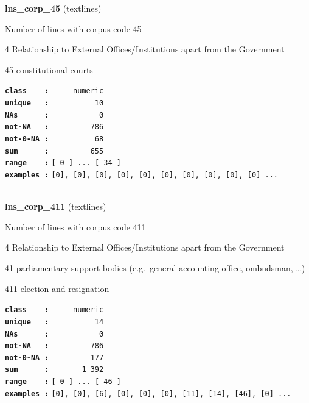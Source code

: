 \documentclass[]{article}
\begin{document}
\textbf{lns\_corp\_45} (textlines)

Number of lines with corpus code 45

4 Relationship to External Offices/Institutions apart from the
Government

45 constitutional courts

\textbf{\texttt{class\ \ \ \ :}} \texttt{~~~~~numeric}\\
\textbf{\texttt{unique\ \ \ :}} \texttt{~~~~~~~~~~10}\\
\textbf{\texttt{NAs\ \ \ \ \ \ :}} \texttt{~~~~~~~~~~~0}\\
\textbf{\texttt{not-NA\ \ \ :}} \texttt{~~~~~~~~~786}\\
\textbf{\texttt{not-0-NA\ :}} \texttt{~~~~~~~~~~68}\\
\textbf{\texttt{sum\ \ \ \ \ \ :}} \texttt{~~~~~~~~~655}\\
\textbf{\texttt{range\ \ \ \ :}}
\texttt{{[}\ 0\ {]}\ ...\ {[}\ 34\ {]}}\\
\textbf{\texttt{examples\ :}}
\texttt{{[}0{]},\ {[}0{]},\ {[}0{]},\ {[}0{]},\ {[}0{]},\ {[}0{]},\ {[}0{]},\ {[}0{]},\ {[}0{]},\ {[}0{]}\ ...}\\

~

\textbf{lns\_corp\_411} (textlines)

Number of lines with corpus code 411

4 Relationship to External Offices/Institutions apart from the
Government

41 parliamentary support bodies (e.g.~general accounting office,
ombudsman, \ldots{})

411 election and resignation

\textbf{\texttt{class\ \ \ \ :}} \texttt{~~~~~numeric}\\
\textbf{\texttt{unique\ \ \ :}} \texttt{~~~~~~~~~~14}\\
\textbf{\texttt{NAs\ \ \ \ \ \ :}} \texttt{~~~~~~~~~~~0}\\
\textbf{\texttt{not-NA\ \ \ :}} \texttt{~~~~~~~~~786}\\
\textbf{\texttt{not-0-NA\ :}} \texttt{~~~~~~~~~177}\\
\textbf{\texttt{sum\ \ \ \ \ \ :}} \texttt{~~~~~~~1~392}\\
\textbf{\texttt{range\ \ \ \ :}}
\texttt{{[}\ 0\ {]}\ ...\ {[}\ 46\ {]}}\\
\textbf{\texttt{examples\ :}}
\texttt{{[}0{]},\ {[}0{]},\ {[}6{]},\ {[}0{]},\ {[}0{]},\ {[}0{]},\ {[}11{]},\ {[}14{]},\ {[}46{]},\ {[}0{]}\ ...}\\
\end{document}
